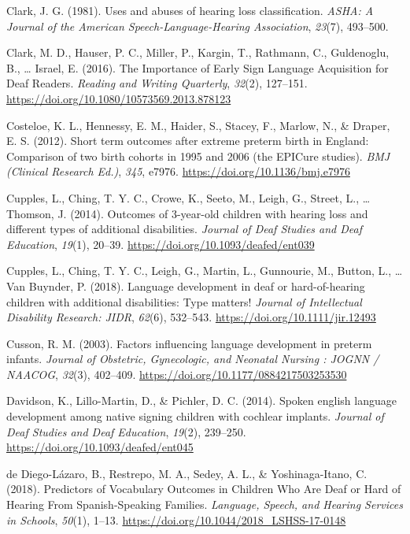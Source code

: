 \documentclass[english,man]{apa6}
\begin{document}
\leavevmode\hypertarget{ref-clark1981}{}%
Clark, J. G. (1981). Uses and abuses of hearing loss classification. \emph{ASHA: A Journal of the American Speech-Language-Hearing Association}, \emph{23}(7), 493--500.

\leavevmode\hypertarget{ref-clark2016}{}%
Clark, M. D., Hauser, P. C., Miller, P., Kargin, T., Rathmann, C., Guldenoglu, B., \ldots{} Israel, E. (2016). The Importance of Early Sign Language Acquisition for Deaf Readers. \emph{Reading and Writing Quarterly}, \emph{32}(2), 127--151. \url{https://doi.org/10.1080/10573569.2013.878123}

\leavevmode\hypertarget{ref-costeloe2012}{}%
Costeloe, K. L., Hennessy, E. M., Haider, S., Stacey, F., Marlow, N., \& Draper, E. S. (2012). Short term outcomes after extreme preterm birth in England: Comparison of two birth cohorts in 1995 and 2006 (the EPICure studies). \emph{BMJ (Clinical Research Ed.)}, \emph{345}, e7976. \url{https://doi.org/10.1136/bmj.e7976}

\leavevmode\hypertarget{ref-cupples2014}{}%
Cupples, L., Ching, T. Y. C., Crowe, K., Seeto, M., Leigh, G., Street, L., \ldots{} Thomson, J. (2014). Outcomes of 3-year-old children with hearing loss and different types of additional disabilities. \emph{Journal of Deaf Studies and Deaf Education}, \emph{19}(1), 20--39. \url{https://doi.org/10.1093/deafed/ent039}

\leavevmode\hypertarget{ref-cupples2018}{}%
Cupples, L., Ching, T. Y. C., Leigh, G., Martin, L., Gunnourie, M., Button, L., \ldots{} Van Buynder, P. (2018). Language development in deaf or hard-of-hearing children with additional disabilities: Type matters! \emph{Journal of Intellectual Disability Research: JIDR}, \emph{62}(6), 532--543. \url{https://doi.org/10.1111/jir.12493}

\leavevmode\hypertarget{ref-cusson2003}{}%
Cusson, R. M. (2003). Factors influencing language development in preterm infants. \emph{Journal of Obstetric, Gynecologic, and Neonatal Nursing : JOGNN / NAACOG}, \emph{32}(3), 402--409. \url{https://doi.org/10.1177/0884217503253530}

\leavevmode\hypertarget{ref-davidson2014}{}%
Davidson, K., Lillo-Martin, D., \& Pichler, D. C. (2014). Spoken english language development among native signing children with cochlear implants. \emph{Journal of Deaf Studies and Deaf Education}, \emph{19}(2), 239--250. \url{https://doi.org/10.1093/deafed/ent045}

\leavevmode\hypertarget{ref-dediego-lazaro2018}{}%
de Diego-Lázaro, B., Restrepo, M. A., Sedey, A. L., \& Yoshinaga-Itano, C. (2018). Predictors of Vocabulary Outcomes in Children Who Are Deaf or Hard of Hearing From Spanish-Speaking Families. \emph{Language, Speech, and Hearing Services in Schools}, \emph{50}(1), 1--13. \url{https://doi.org/10.1044/2018_LSHSS-17-0148}
\end{document}
